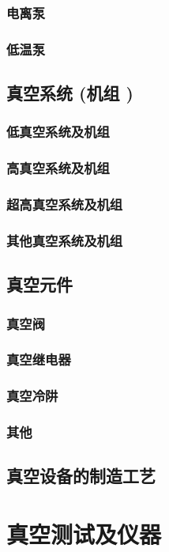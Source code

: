 \documentclass[UTF8]{../../ApplicationUniverse}
\begin{document}
        \subsubsection{电离泵}
        \subsubsection{低温泵}
    \subsection{真空系统 (机组 )}
        \subsubsection{低真空系统及机组}
        \subsubsection{高真空系统及机组}
        \subsubsection{超高真空系统及机组}
        \subsubsection{其他真空系统及机组}
    \subsection{真空元件}
        \subsubsection{真空阀}
        \subsubsection{真空继电器}
        \subsubsection{真空冷阱}
        \subsubsection{其他}
    \subsection{真空设备的制造工艺}
\section{真空测试及仪器}
\end{document}
